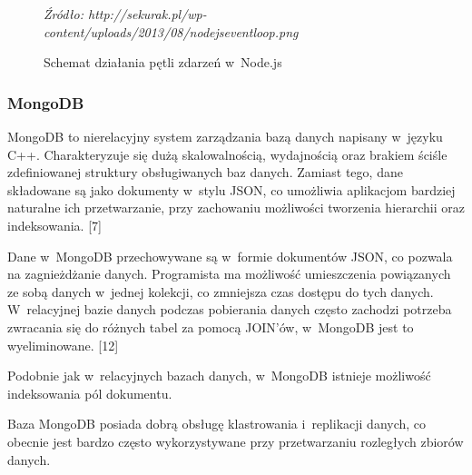 \documentclass[8pt,a4paper,notitlepage]{article}
\begin{document}
\begin{figure}[H]
\begin{center}
\caption{Schemat działania pętli zdarzeń w~Node.js}
\end{center}
\textit{Źródło: http://sekurak.pl/wp-content/uploads/2013/08/nodejseventloop.png}
\end{figure}

\subsubsection{MongoDB}
MongoDB to nierelacyjny system zarządzania bazą danych napisany w~języku C++. Charakteryzuje się dużą skalowalnością, wydajnością oraz brakiem ściśle zdefiniowanej struktury obsługiwanych baz danych. Zamiast tego, dane składowane są jako dokumenty w~stylu JSON, co umożliwia aplikacjom bardziej naturalne ich przetwarzanie, przy zachowaniu możliwości tworzenia hierarchii oraz indeksowania. [7]

\par Dane w~MongoDB przechowywane są w~formie dokumentów JSON, co pozwala na zagnieżdżanie danych. Programista ma możliwość umieszczenia powiązanych ze sobą danych w~jednej kolekcji, co zmniejsza czas dostępu do tych danych. W~relacyjnej bazie danych podczas pobierania danych często zachodzi potrzeba zwracania się do różnych tabel za pomocą JOIN'ów, w~MongoDB jest to wyeliminowane. [12]

\par Podobnie jak w~relacyjnych bazach danych, w~MongoDB istnieje możliwość indeksowania pól dokumentu.

\par Baza MongoDB posiada dobrą obsługę klastrowania i~replikacji danych, co obecnie jest bardzo często wykorzystywane przy przetwarzaniu rozległych zbiorów danych.
\end{document}
